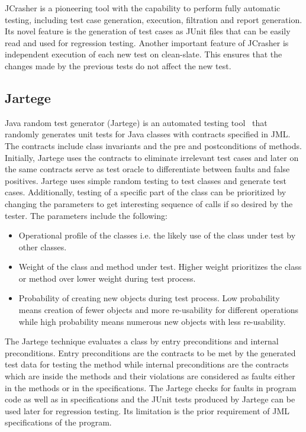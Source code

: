 JCrasher is a pioneering tool with the capability to perform fully automatic testing, including test case generation, execution, filtration and report generation. Its novel feature is the generation of test cases as JUnit files that can be easily read and used for regression testing. Another important feature of JCrasher is independent execution of each new test on clean-slate. This ensures that the changes made by the previous tests do not affect the new test.  



\subsection{Jartege} \label{jartege_2}
Java random test generator (Jartege) is an automated testing tool~\cite{oriat2005jartege} that randomly generates unit tests for Java classes with contracts specified in JML. The contracts include class invariants and the pre and postconditions of methods. Initially, Jartege uses the contracts to eliminate irrelevant test cases and later on the same contracts serve as test oracle to differentiate between faults and false positives. Jartege uses simple random testing to test classes and generate test cases. Additionally, testing of a specific part of the class can be prioritized by changing the parameters to get interesting sequence of calls if so desired by the tester. The parameters include the following: 

\begin{itemize}
\item Operational profile of the classes i.e. the likely use of the class under test by other classes.  
\item Weight of the class and method under test. Higher weight prioritizes the class or method over lower weight during test process. 
\item Probability of creating new objects during test process. Low probability means creation of fewer objects and more re-usability for different operations while high probability means numerous new objects with less re-usability.
\end{itemize}

The Jartege technique evaluates a class by entry preconditions and internal preconditions. Entry preconditions are the contracts to be met by the generated test data for testing the method while internal preconditions are the contracts which are inside the methods and their violations are considered as faults either in the methods or in the specifications. The Jartege checks for faults in program code as well as in specifications and the JUnit tests produced by Jartege can be used later for regression testing. Its limitation is the prior requirement of JML specifications of the program.

